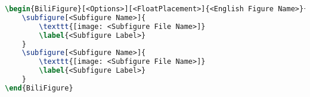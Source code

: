 \begin{lstlisting}[language=LaTeX, label=listing:bilingual-subfigure]
\begin{BiliFigure}[<Options>][<FloatPlacement>]{<English Figure Name>}{<中文图名>}
    \subfigure[<Subfigure Name>]{
        \texttt{[image: <Subfigure File Name>]}
        \label{<Subfigure Label>}
    }
    \subfigure[<Subfigure Name>]{
        \texttt{[image: <Subfigure File Name>]}
        \label{<Subfigure Label>}
    }
\end{BiliFigure}
\end{lstlisting}